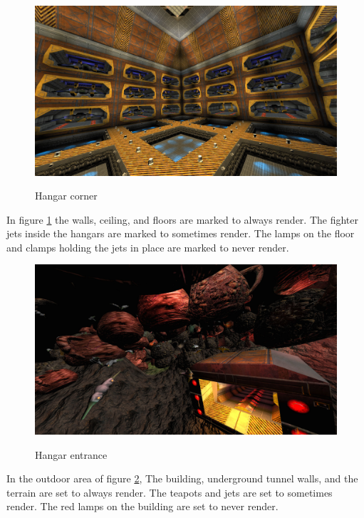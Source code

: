 \documentclass[12pt]{ucthesis}
\newcommand{\captionfonts}{\small\bf\ssp}
\begin{document}
\begin{figure}
\begin{center}
\includegraphics[width=\textwidth]{Images/HangarCorner.jpg}
\captionfonts
\caption[Hangar Corner]{Hangar corner}
\label{fig:hangar-corner}
\end{center}
\end{figure}

In figure \ref{fig:hangar-corner} the walls, ceiling, and floors are marked to always render.
The fighter jets inside the hangars are marked to sometimes render.
The lamps on the floor and clamps holding the jets in place are marked to never render.

\begin{figure}
\begin{center}
\includegraphics[width=\textwidth]{Images/HangarEntrance.jpg}
\captionfonts
\caption[Hangar Entrance]{Hangar entrance}
\label{fig:hangar-entrance_}
\end{center}
\end{figure}

In the outdoor area of figure \ref{fig:hangar-entrance_}, The building, underground tunnel walls, and the terrain are set to always render.
The teapots and jets are set to sometimes render.
The red lamps on the building are set to never render.
\end{document}
